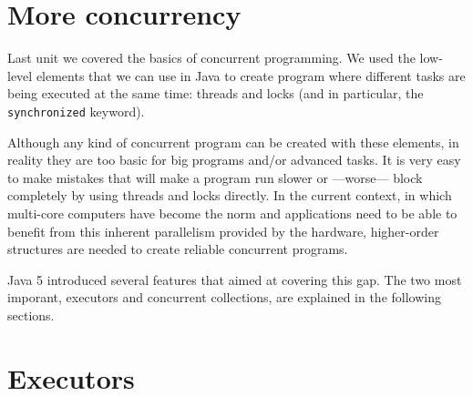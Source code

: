 \section{More concurrency}
\label{sec:more-concurrency}

Last unit we covered the basics of concurrent programming. We used the
low-level elements that we can use in Java to create program where
different tasks are being executed at the same time: threads and
locks (and in particular, the \verb+synchronized+ keyword). 

Although any kind of concurrent program can be created with these
elements, in reality they are too basic for big programs and/or
advanced tasks. It is very easy to make mistakes that will make a
program run slower or ---worse--- block completely by using threads
and locks directly. In the current context, in which multi-core
computers have become the norm and applications need to be able to
benefit from this inherent parallelism provided by the hardware,
higher-order structures are needed to create reliable concurrent
programs. 

Java 5 introduced several features that aimed at covering this
gap. The two most imporant, executors and concurrent collections, are
explained in the following sections.


\section{Executors}
\label{sec:executors}

